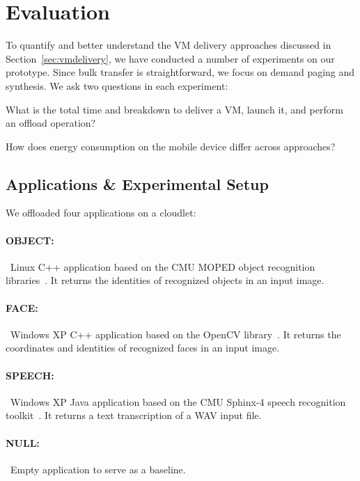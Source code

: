 \section{Evaluation}
\label{sec:evaluation}

To quantify and better understand the VM delivery approaches discussed
in Section~\ref{sec:vmdelivery}, we have conducted a number of
experiments on our prototype.  Since bulk transfer is straightforward,
we focus on demand paging and synthesis. We ask two questions in each experiment:
\begin{smitemize} 
\item{What is the total time and breakdown to
deliver a VM, launch it, and perform an offload operation?}

\item{How does energy consumption on the mobile device differ across approaches?}
\end{smitemize}

\subsection{Applications \& Experimental Setup}
\label{sec:setup}

We offloaded four applications on a cloudlet:
\paragraph{OBJECT:}~Linux C++ application based
on the CMU MOPED object recognition libraries~\cite{MOPED2011}. 
It returns the identities of recognized objects in an input image.

\paragraph{FACE:}~Windows XP C++ application
based on the OpenCV library~\cite{OPENCV2011}. It
returns the coordinates and identities of recognized faces in an input image.

\paragraph{SPEECH:}~Windows XP Java application
based on the CMU Sphinx-4 speech recognition
toolkit~\cite{Sphinx2011}. It returns a text transcription of a WAV input
file.

\paragraph{NULL:}~Empty application to serve as a baseline.


